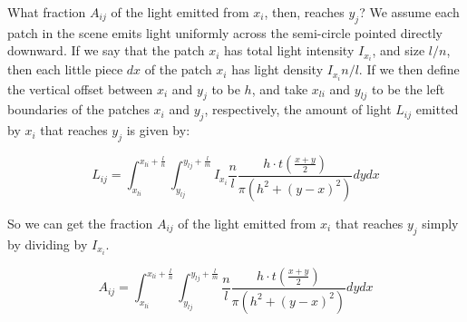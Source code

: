 \documentclass[11pt]{article}
\begin{document}
What fraction $A_{ij}$ of the light emitted from $x_i$, then, reaches $y_j$? We assume each patch in the scene emits light uniformly across the semi-circle pointed directly downward. If we say that the patch $x_i$ has total light intensity $I_{x_i}$, and size $l/n$, then each little piece $dx$ of the patch $x_i$ has light density $I_{x_i} n/l$. If we then define the vertical offset between $x_i$ and $y_j$ to be $h$, and take $x_{li}$ and $y_{lj}$ to be the left boundaries of the patches $x_i$ and $y_j$, respectively, the amount of light $L_{ij}$ emitted by $x_i$ that reaches $y_j$ is given by:


    
    
 
\begin{equation}
    L_{ij} = \int_{x_{li}}^{x_{li} + \frac{l}{n}} \int_{y_{lj}}^{y_{lj} + \frac{l}{m}} I_{x_i} \frac{n}{l} \frac{h \cdot t(\frac{x+y}{2})}{\pi (h^2 + (y - x)^2)} dy dx
\end{equation} 
    

So we can get the fraction $A_{ij}$ of the light emitted from $x_i$ that reaches $y_j$ simply by dividing by $I_{x_i}$.
        

\begin{equation}
    A_{ij} = \int_{x_{li}}^{x_{li} + \frac{l}{n}} \int_{y_{lj}}^{y_{lj} + \frac{l}{m}} \frac{n}{l} \frac{h \cdot t(\frac{x+y}{2})}{\pi (h^2 + (y - x)^2)} dy dx
\end{equation}    
    




\end{document}
